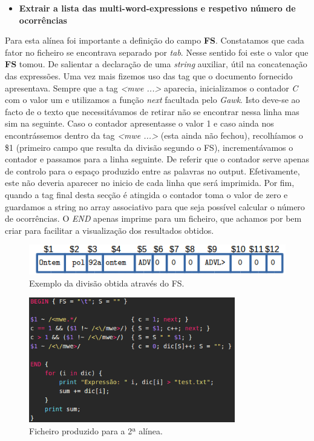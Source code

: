 \documentclass[a4paper]{article}
\begin{document}
\begin{itemize}
	\item \textbf{Extrair a lista das multi-word-expressions e respetivo número de ocorrências}
\end{itemize}
Para esta alínea foi importante a definição do campo \textbf{FS}. Constatamos que cada fator no ficheiro se encontrava separado por \textit{tab}. 
Nesse sentido foi este o valor que \textbf{FS} tomou. De salientar a declaração de uma \textit{string} auxiliar, útil na concatenação das expressões.
Uma vez mais fizemos uso das tag que o documento fornecido apresentava. Sempre que a tag \textit{<mwe ...>} aparecia, inicializamos o contador \textit{C} com o valor um e utilizamos a função \textit{next} facultada pelo \textit{Gawk}. Isto deve-se ao facto de o texto que necessitávamos de retirar não se encontrar nessa linha mas sim na seguinte. Caso o contador apresentasse o valor 1 e caso ainda nos encontrássemos dentro da tag \textit{<mwe ...>} (esta ainda não fechou), recolhíamos o \$1 (primeiro campo que resulta da divisão segundo o FS), incrementávamos o contador e passamos para a linha seguinte. De referir que o contador serve apenas de controlo para o espaço produzido entre as palavras no output. Efetivamente, este não deveria aparecer no inicio de cada linha que será imprimida. Por fim, quando a tag final desta secção é atingida o contador toma o valor de zero e guardamos a string no array associativo para que seja possível calcular o número de ocorrências. O \textit{END} apenas imprime para um ficheiro, que achamos por bem criar para facilitar a visualização dos resultados obtidos.  

\begin{figure}[h!]
  \includegraphics[width=\linewidth]{E1.png}
  \caption{Exemplo da divisão obtida através do FS.}
  \label{fig:example1}
\end{figure}


\begin{figure}[h!]
  \includegraphics[width=90mm]{alinea2.png} \centering
  \caption{Ficheiro produzido para a 2ª alínea.}
  \label{fig:alinea2}
\end{figure}
\end{document}
